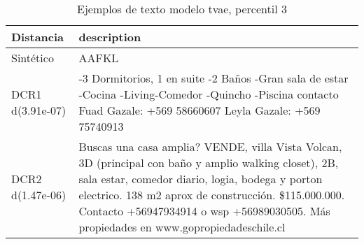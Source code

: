 \begin{table}[H]
\centering
\fontsize{10}{14}\selectfont
\caption{Ejemplos de texto modelo tvae, percentil 3}
\label{table-example-economicos-a-3-tvae-3p-text}
\begin{tabular}{|l|m{35em}|}
\hline
\rowcolor[gray]{0.8}
Distancia & description \\
\hline Sintético & AAFKL \\
\hline DCR1 d(3.91e-07) & -3 Dormitorios, 1 en suite -2 Ba\~nos -Gran sala de estar -Cocina -Living-Comedor -Quincho -Piscina contacto Fuad Gazale: +569 58660607 Leyla Gazale: +569 75740913 \\
\hline DCR2 d(1.47e-06) & Buscas una casa amplia? VENDE, villa Vista Volcan, 3D (principal con ba\~no y amplio walking closet), 2B, sala estar, comedor diario, logia, bodega y porton electrico. 138 m2 aprox de construcci\'on. \$115.000.000. Contacto +56947934914 o wsp +56989030505. M\'as propiedades en www.gopropiedadeschile.cl \\
\hline
\end{tabular}
\end{table}
